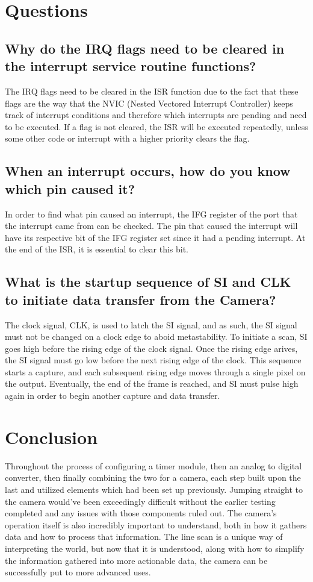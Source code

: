 \documentclass[conference]{IEEEtran}
\begin{document}
\section{Questions}

\subsection{Why do the IRQ flags need to be cleared in the interrupt service
routine functions?}

The IRQ flags need to be cleared in the ISR function due to the fact that
these flags are the way that the NVIC (Nested Vectored Interrupt Controller)
keeps track of interrupt conditions and therefore which interrupts are pending 
and need to be executed. If a flag is not cleared, the ISR will be executed 
repeatedly, unless some other code or interrupt with a higher priority clears 
the flag.

\subsection{When an interrupt occurs, how do you know which pin caused it?}

In order to find what pin caused an interrupt, the IFG register of the port
that the interrupt came from can be checked. The pin that caused the
interrupt will have its respective bit of the IFG register set since it had
a pending interrupt. At the end of the ISR, it is essential to clear this
bit.

\subsection{What is the startup sequence of SI and CLK to initiate data 
transfer from the Camera?}

The clock signal, CLK, is used to latch the SI signal, and as such, the SI
signal must not be changed on a clock edge to aboid metastability. To
initiate a scan, SI goes high before the rising edge of the clock signal.
Once the rising edge arives, the SI signal must go low before the next
rising edge of the clock. This sequence starts a capture, and each subsequent
rising edge moves through a single pixel on the output. Eventually, the end
of the frame is reached, and SI must pulse high again in order to begin
another capture and data transfer.

\section{Conclusion}
Throughout the process of configuring a timer module, then an analog to 
digital converter, then finally combining the two for a camera, each step 
built upon the last and utilized elements which had been set up previously. 
Jumping straight to the camera would've been exceedingly difficult without the
 earlier testing completed and any issues with those components ruled out. The
camera's operation itself is also incredibly important to understand, both in 
how it gathers data and how to process that information. The line scan is a 
unique way of interpreting the world, but now that it is understood, along 
with how to simplify the information gathered into more actionable data, the 
camera can be successfully put to more advanced uses.
\end{document}

